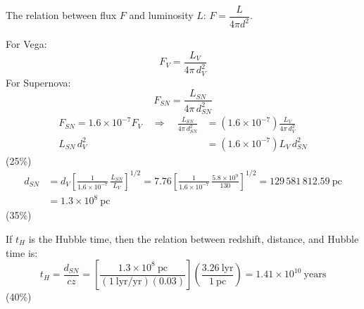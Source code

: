 The relation between flux $F$ and luminosity $L$:
$F = \dfrac{L}{4\pi d^2}$.

For Vega:
\[
F_V = \frac{L_V}{4\pi\,d_V^2}
\]
For Supernova:
\[
F_{SN} = \frac{L_{SN}}{4\pi\,d_{SN}^2}
\]
\begin{align*}
F_{SN} = 1.6\times10^{-7}F_V
\quad\Longrightarrow\quad
\frac{L_{SN}}{4\pi\,d_{SN}^2}
  &= \left(1.6\times10^{-7}\right)\frac{L_V}{4\pi\,d_V^2}\\
L_{SN}\,d_V^2 &= \left(1.6\times10^{-7}\right)L_V\,d_{SN}^2
\end{align*}
\hfill(25\%)
\begin{align*}
d_{SN} &= d_V\left[\frac{1}{1.6\times10^{-7}}\,
  \frac{L_{SN}}{L_V}\right]^{1/2}
= 7.76\left[\frac{1}{1.6\times10^{-7}}\,
  \frac{5.8\times10^{9}}{130}\right]^{1/2}
= 129\,581\,812.59\ \mathrm{pc}\\
&= 1.3\times10^{8}\ \mathrm{pc}
\end{align*}
\hfill(35\%)

If $t_H$ is the Hubble time, then the relation between redshift, distance, and
Hubble time is:
\[
t_H = \frac{d_{SN}}{cz}
= \left[\frac{1.3\times10^{8}\ \mathrm{pc}}
  {(1\ \mathrm{lyr/yr})(0.03)}\right]
  \left(\frac{3.26\ \mathrm{lyr}}{1\ \mathrm{pc}}\right)
= 1.41\times10^{10}\ \mathrm{years}
\]
\hfill(40\%)
